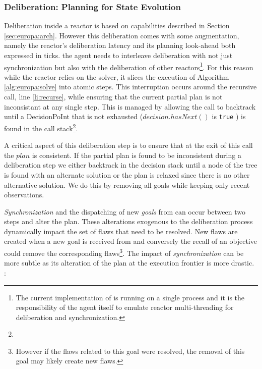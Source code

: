 
\subsubsection{Deliberation: Planning for  State Evolution}
\label{sec:arch:plan}

Deliberation inside a reactor is based on \eu capabilities described
in Section \ref{sec:europa:arch}. However this deliberation comes with
some augmentation, namely the reactor's deliberation latency
\kcomment{($\lambda$)} and its planning look-ahead \kcomment{($\pi$)}
both expressed in ticks.  the agent needs to
interleave deliberation with not just synchronization but also with
the deliberation of other reactors\footnote{The current implementation
  of \rx is running on a single process and it is the responsibility
  of the agent itself to emulate reactor multi-threading for
  deliberation and synchronization.}.  For this reason while the
reactor relies on the \eu solver, it slices the execution of Algorithm
\ref{alg:europa:solve} into atomic steps. This interruption occurs
around the recursive call, line \ref{li:recurse}, while ensuring that
the current partial plan is not inconsistant at any single step. This
is managed by allowing the call to backtrack until a
\textsf{DecisionPoInt} that is not exhausted (\ie $decision.hasNext()$
is \texttt{true} ) is found in the call
stack\footnote{}.

A critical aspect of this deliberation step is to ensure that at the
exit of this call the $plan$ is consistent.  If the partial plan is
found to be inconsistent during a deliberation step we either
backtrack in the decision stack until a node of the 
tree is found with an alternate solution or the plan is relaxed since
there is no other alternative solution. We do this by removing all
goals while keeping only recent observations.

{\em Synchronization} and the dispatching of new {\em goals} from \rx
can occur between two steps and alter the plan. These alterations
exogenous to the deliberation process dynamically impact the set of
flaws that need to be resolved. New flaws are created when a new goal
is received from \rx and conversely the recall of an objective could
remove the corresponding flaws\footnote{However if the flaws related
  to this goal were resolved, the removal of this goal may likely
  create new flaws.}. The impact of {\em synchronization} can be more
subtle as its alteration of the plan at the execution frontier is more
drastic. :

